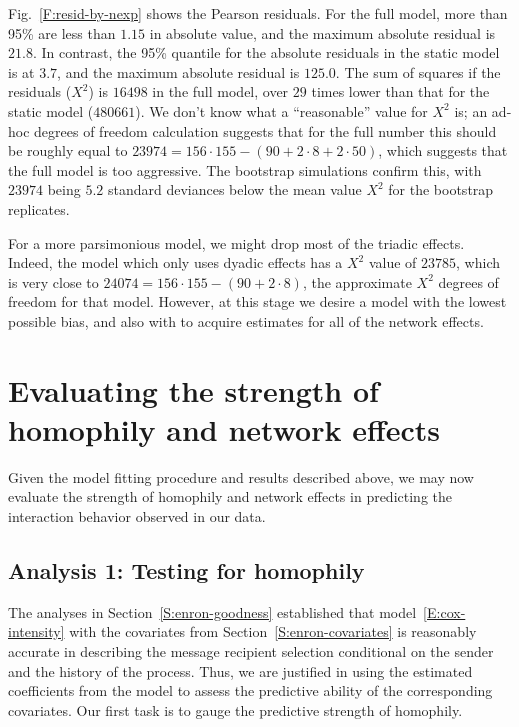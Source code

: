 \documentclass[final]{statsoc}
\begin{document}
Fig.~\ref{F:resid-by-nexp} shows the Pearson residuals.  For the full model,
more than 95\% are less than $1.15$ in absolute value, and the maximum
absolute residual is $21.8$.  In contrast, the 95\% quantile for the absolute
residuals in the static model is at $3.7$, and the maximum absolute residual
is $125.0$.  The sum of squares if the residuals ($X^2$) is $16498$ in the
full model, over $29$ times lower than that for the static model ($480661$).
We don't know what a ``reasonable'' value for $X^2$ is; an ad-hoc degrees of
freedom calculation suggests that for the full number this should be roughly
equal to $23974 = 156 \cdot 155 - (90 + 2 \cdot 8 + 2 \cdot 50)$, which
suggests that the full model is too aggressive.  The bootstrap simulations
confirm this, with $23974$ being $5.2$ standard deviances below the mean
value $X^2$ for the bootstrap replicates.

For a more parsimonious model, we might drop most of the triadic effects.
Indeed, the model which only uses dyadic effects has a $X^2$ value of $23785$,
which is very close to $24074 = 156 \cdot 155 - (90 + 2 \cdot 8)$, the
approximate $X^2$ degrees of freedom for that model.  However, at this stage
we desire a model with the lowest possible bias, and also with to acquire estimates for all
of the network effects.

\section{Evaluating the strength of homophily and network effects}\label{S:strength-of-effects}

Given the model fitting procedure and results described above, we may now evaluate the strength of homophily and network effects in predicting the interaction behavior observed in our data.

\subsection{Analysis 1: Testing for homophily}\label{S:enron-homophily}

The analyses in Section~\ref{S:enron-goodness} established that
model~\eqref{E:cox-intensity} with the covariates from
Section~\ref{S:enron-covariates} is reasonably accurate in describing the
message recipient selection conditional on the sender and the history of the
process.  Thus, we are justified in using the estimated coefficients from the
model to assess the predictive ability of the corresponding covariates.  Our
first task is to gauge the predictive strength of homophily.
\end{document}
